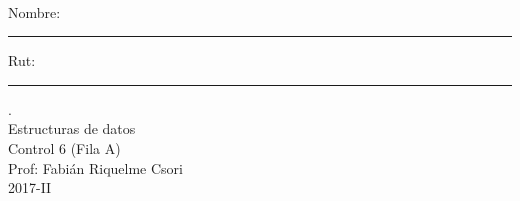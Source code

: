 \documentclass[letter,12pt,oneside]{book}
\theoremstyle{definition}
\begin{document}

\begin{center}
$~$
\end{center}

\noindent
Nombre: \rule{.6\textwidth}{.5pt} Rut: \rule{.24\textwidth}{.5pt}

\begin{center}
 {\Large
  {\color{white}.}\\
  Estructuras de datos\\[1ex]
  Control 6 (Fila A)}\\[1.2ex]
  Prof: Fabián Riquelme Csori\\
  2017-II
\end{center}
\end{document}
